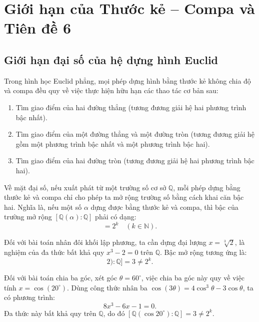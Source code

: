 \chapter{Giới hạn của Thước kẻ -- Compa và Tiên đề 6}

\section{Giới hạn đại số của hệ dựng hình Euclid}

Trong hình học Euclid phẳng, mọi phép dựng hình bằng thước kẻ không chia độ và compa đều quy về việc thực hiện hữu hạn các thao tác cơ bản sau:
\begin{enumerate}
    \item Tìm giao điểm của hai đường thẳng (tương đương giải hệ hai phương trình bậc nhất).
    \item Tìm giao điểm của một đường thẳng và một đường tròn (tương đương giải hệ gồm một phương trình bậc nhất và một phương trình bậc hai).
    \item Tìm giao điểm của hai đường tròn (tương đương giải hệ hai phương trình bậc hai).
\end{enumerate}

Về mặt đại số, nếu xuất phát từ một trường số cơ sở $\mathbb{Q}$, mỗi phép dựng bằng thước kẻ và compa chỉ cho phép ta mở rộng trường số bằng cách khai căn bậc hai. Nghĩa là, nếu một số $\alpha$ dựng được bằng thước kẻ và compa, thì bậc của trường mở rộng $[\mathbb{Q}(\alpha) : \mathbb{Q}]$ phải có dạng:
\begin{equation}
    [\mathbb{Q}(\alpha) : \mathbb{Q}] = 2^k \quad (k \in \mathbb{N}).
\end{equation}

Đối với bài toán nhân đôi khối lập phương, ta cần dựng đại lượng $x = \sqrt[3]{2}$, là nghiệm của đa thức bất khả quy $x^3 - 2 = 0$ trên $\mathbb{Q}$. Bậc mở rộng tương ứng là:
\begin{equation}
    [\mathbb{Q}(\sqrt[3]{2}) : \mathbb{Q}] = 3 \neq 2^k.
\end{equation}

Đối với bài toán chia ba góc, xét góc $\theta = 60^\circ$, việc chia ba góc này quy về việc tính $x = \cos(20^\circ)$. Dùng công thức nhân ba $\cos(3\theta) = 4\cos^3\theta - 3\cos\theta$, ta có phương trình:
\begin{equation}
    8x^3 - 6x - 1 = 0.
\end{equation}
Đa thức này bất khả quy trên $\mathbb{Q}$, do đó $[\mathbb{Q}(\cos 20^\circ) : \mathbb{Q}] = 3 \neq 2^k$.

